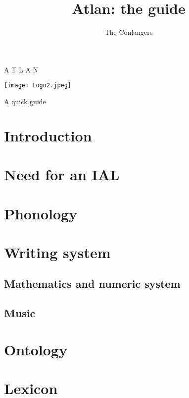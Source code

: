 \documentclass[twoside, openany, 12pt, a5paper]{book}
\title{Atlan: the guide}
\author{The Conlangers}
\date{}
\begin{document}
\frontmatter
\begin{titlepage}
\begin{center}
{{\fontsize{30}{36}\selectfont \Huge A T L A N}}
\vspace{2cm}

\texttt{[image: Logo2.jpeg]}

\vspace{3cm}
{{\fontsize{30}{36}\selectfont \Large A quick guide}}
\end{center}
\end{titlepage}
\restoregeometry
\blindtext[5]

\mainmatter
\chapter{Introduction}
\Blindtext

\chapter{Need for an IAL}

\Blindtext

\chapter{Phonology}


\Blindtext
\chapter{Writing system}

\Blindtext
\section*{Mathematics and numeric system}

\Blindtext
\section*{Music}

\blindtext[1]

\chapter{Ontology}
\blindtext[3]
\chapter{Lexicon}
\end{document}
